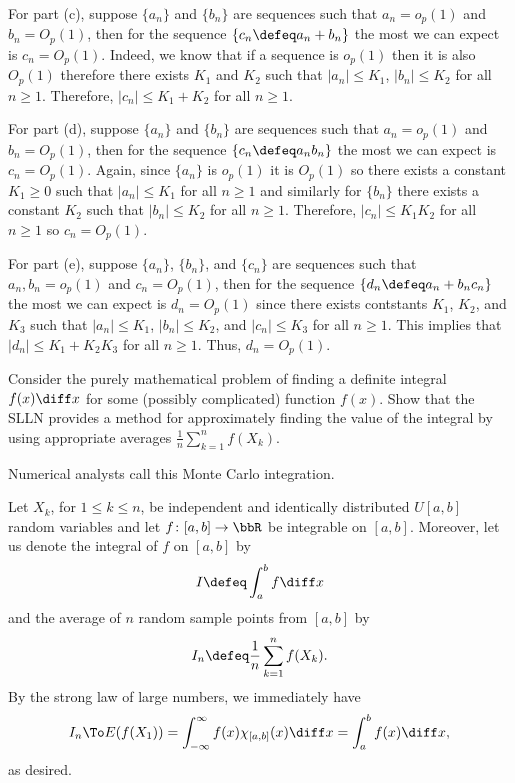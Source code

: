 \begin{solution}
  For part (c), suppose \(\{a_n\}\) and \(\{b_n\}\) are sequences such that
  \(a_n=o_p(1)\) and \(b_n=O_p(1)\), then for the sequence
  \(\{c_n\defeq a_n+b_n\}\) the most we can expect is
  \(c_n=O_p(1)\). Indeed, we know that if a sequence is \(o_p(1)\)
  then it is also \(O_p(1)\) therefore there exists \(K_1\) and \(K_2\)
  such that \(|a_n|\leq K_1\), \(|b_n|\leq K_2\) for all \(n\geq
  1\). Therefore, \(|c_n|\leq K_1+K_2\) for all \(n\geq 1\).

  For part (d), suppose \(\{a_n\}\) and \(\{b_n\}\) are sequences such that
  \(a_n=o_p(1)\) and \(b_n=O_p(1)\), then for the sequence
  \(\{c_n\defeq a_nb_n\}\) the most we can expect is
  \(c_n=O_p(1)\). Again, since \(\{a_n\}\) is \(o_p(1)\) it is
  \(O_p(1)\) so there exists a constant \(K_1\geq 0\) such that
  \(|a_n|\leq K_1\) for all \(n\geq 1\) and similarly for \(\{b_n\}\) there
  exists a constant \(K_2\) such that \(|b_n|\leq K_2\) for all
  \(n\geq 1\). Therefore, \(|c_n|\leq K_1K_2\) for all \(n\geq 1\) so
  \(c_n=O_p(1)\).

  For part (e), suppose \(\{a_n\}\), \(\{b_n\}\), and \(\{c_n\}\) are
  sequences such that \(a_n,b_n=o_p(1)\) and \(c_n=O_p(1)\), then for
  the sequence \(\{d_n\defeq a_n+b_nc_n\}\) the most we can expect is
  \(d_n=O_p(1)\) since there exists contstants \(K_1\), \(K_2\), and
  \(K_3\) such that \(|a_n|\leq K_1\), \(|b_n|\leq K_2\), and
  \(|c_n|\leq K_3\) for all \(n\geq 1\). This implies that
  \(|d_n|\leq K_1+K_2K_3\) for all \(n\geq 1\). Thus, \(d_n=O_p(1)\).
\end{solution}
\newpage

\begin{problem}
  Consider the purely mathematical problem of finding a definite integral
  \(f(x)\diff x\) for some (possibly complicated) function \(f(x)\). Show
  that the SLLN provides a method for approximately finding the value of
  the integral by using appropriate averages
  \(\frac{1}{n}\sum_{k=1}^n f(X_k)\).

  Numerical analysts call this Monte Carlo integration.
\end{problem}
\begin{solution}
  Let \(X_k\), for \(1\leq k\leq n\), be independent and identically
  distributed \(U[a,b]\) random variables and let \(f\colon[a,b]\to\bbR\)
  be integrable on \([a,b]\). Moreover, let us denote the integral of \(f\)
  on \([a,b]\) by
  \[
    I\defeq\int_a^b f\diff x
  \]
  and the average of \(n\) random sample points from \([a,b]\) by
  \[
    I_n\defeq\frac{1}{n}\sum_{k=1}^n f(X_k).
  \]
  By the strong law of large numbers, we immediately have
  \[
    I_n\To E(f(X_1))=\int_{-\infty}^\infty f(x)\chi_{[a,b]}(x)\diff
    x=\int_a^b f(x)\diff x,
  \]
  as desired.
\end{solution}
\newpage

